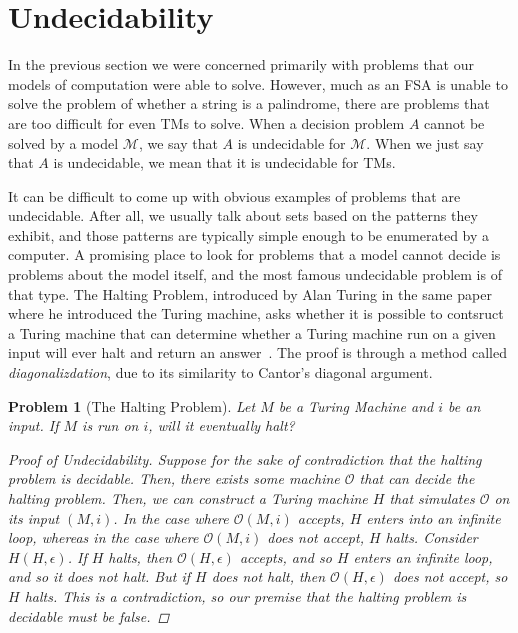 \documentclass[psamsfonts]{amsart}
\newtheorem{thm}{Theorem}[section]
\newtheorem{prob}[thm]{Problem}
\theoremstyle{definition}
\theoremstyle{remark}
\numberwithin{equation}{section}
\begin{document}
\section{Undecidability}
In the previous section we were concerned primarily with problems that our
models of computation were able to solve. However, much as an \ac{FSA} is unable
to solve the problem of whether a string is a palindrome, there are problems
that are too difficult for even \aclp{TM} to solve. When a decision problem $A$
cannot be solved by a model $\mathcal{M}$, we say that $A$ is undecidable for
$\mathcal{M}$. When we just say that $A$ is undecidable, we mean that it is
undecidable for \acp{TM}. \par
It can be difficult to come up with obvious examples of problems that are
undecidable. After all, we usually talk about sets based on the patterns they
exhibit, and those patterns are typically simple enough to be enumerated by a
computer. A promising place to look for problems that a model cannot decide is
problems about the model itself, and the most famous undecidable problem is of
that type. The Halting Problem, introduced by Alan Turing in the same paper
where he introduced the Turing machine, asks whether it is possible to contsruct
a Turing machine that can determine whether a Turing machine run on a given
input will ever halt and return an
answer~\cite{turing37_comput_number_with_applic_to_entsc}. The proof is through
a method called \emph{diagonalizdation}, due to its similarity to Cantor's
diagonal argument. 

\begin{prob}[The Halting Problem]
  \label{prob:halting}
  Let $M$ be a Turing Machine and $i$ be an input. If $M$ is run on $i$, will it
  eventually halt?
  \begin{proof}[Proof of Undecidability]
    Suppose for the sake of contradiction that the halting problem is
    decidable. Then, there exists some machine
    $\mathcal{O}$ that can decide the halting problem. Then, we can construct a
    Turing machine $H$ that simulates $\mathcal{O}$ on its input $(M,i)$. In the
    case where $\mathcal{O}(M,i)$ accepts, $H$ enters into an infinite
    loop, whereas in the case where $\mathcal{O}(M,i)$ does not accept, $H$
    halts. Consider $H(H,\epsilon)$. If $H$ halts, then
    $\mathcal{O}(H,\epsilon)$ accepts, and so $H$ enters an infinite loop, and
    so it does not halt. But if $H$ does not halt, then
    $\mathcal{O}(H,\epsilon)$ does not accept, so $H$ halts. This is a
    contradiction, so our premise that the halting problem is decidable must be false.
  \end{proof}
\end{prob}
\end{document}
